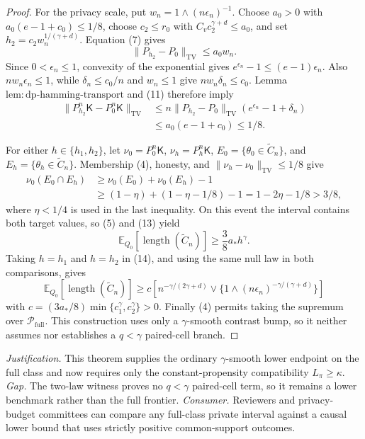 \documentclass{article}
\begin{document}
\begin{proof}
For the privacy scale, put \(w_n=1\wedge(n\epsilon_n)^{-1}\).  Choose \(a_0>0\) with \(a_0(e-1+c_0)\le1/8\), choose \(c_2\le r_0\) with \(C_vc_2^{\gamma+d}\le a_0\), and set \(h_2=c_2w_n^{1/(\gamma+d)}\).  Equation (7) gives
\[
 \|P_{h_2}-P_0\|_{\mathrm{TV}}\le a_0w_n.
\tag{11}
\]
Since \(0<\epsilon_n\le1\), convexity of the exponential gives \(e^{\epsilon_n}-1\le(e-1)\epsilon_n\).  Also \(nw_n\epsilon_n\le1\), while \(\delta_n\le c_0/n\) and \(w_n\le1\) give \(nw_n\delta_n\le c_0\).  Lemma \(\mathrm{lem{:}dp\text{-}hamming\text{-}transport}\) and (11) therefore imply
\[
 \begin{aligned}
 \|P_{h_2}^n\mathsf K-P_0^n\mathsf K\|_{\mathrm{TV}}
 &\le n\|P_{h_2}-P_0\|_{\mathrm{TV}}
       (e^{\epsilon_n}-1+\delta_n)\\
 &\le a_0(e-1+c_0)\le1/8.
 \end{aligned}
\tag{12}
\]

For either \(h\in\{h_1,h_2\}\), let \(\nu_0=P_0^n\mathsf K\), \(\nu_h=P_h^n\mathsf K\), \(E_0=\{\theta_0\in\widetilde C_n\}\), and \(E_h=\{\theta_h\in\widetilde C_n\}\).  Membership (4), honesty, and \(\|\nu_h-\nu_0\|_{\mathrm{TV}}\le1/8\) give
\[
 \begin{aligned}
 \nu_0(E_0\cap E_h)
 &\ge \nu_0(E_0)+\nu_0(E_h)-1\\
 &\ge(1-\eta)+(1-\eta-1/8)-1
 =1-2\eta-1/8>3/8,
 \end{aligned}
\tag{13}
\]
where \(\eta<1/4\) is used in the last inequality.  On this event the interval contains both target values, so (5) and (13) yield
\[
 \mathbb E_{Q_0}[\operatorname{length}(\widetilde C_n)]
 \ge\frac38a_*h^\gamma.
\tag{14}
\]
Taking \(h=h_1\) and \(h=h_2\) in (14), and using the same null law in both comparisons, gives
\[
 \mathbb E_{Q_0}[\operatorname{length}(\widetilde C_n)]
 \ge c\left[n^{-\gamma/(2\gamma+d)}
 \vee\{1\wedge(n\epsilon_n)^{-\gamma/(\gamma+d)}\}\right]
\]
with \(c=(3a_*/8)\min\{c_1^\gamma,c_2^\gamma\}>0\).  Finally (4) permits taking the supremum over \(\mathcal P_{\mathrm{full}}\).  This construction uses only a \(\gamma\)-smooth contrast bump, so it neither assumes nor establishes a \(q<\gamma\) paired-cell branch.
\end{proof}
\par\smallskip\noindent \textit{Justification.} This theorem supplies the ordinary \(\gamma\)-smooth lower endpoint on the full class and now requires only the constant-propensity compatibility \(L_\pi\ge\kappa\). \textit{Gap.} The two-law witness proves no \(q<\gamma\) paired-cell term, so it remains a lower benchmark rather than the full frontier. \textit{Consumer.} Reviewers and privacy-budget committees can compare any full-class private interval against a causal lower bound that uses strictly positive common-support outcomes.
\end{document}
